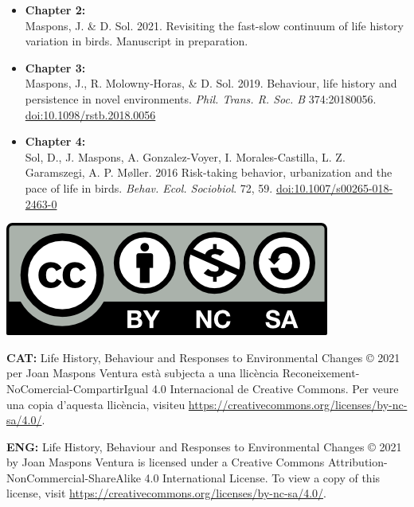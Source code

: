 \documentclass[12pt,a4paper,twoside,fleqn]{memoir}
\begin{document}
\begin{itemize}
  \item \textbf{Chapter 2:} \\
  Maspons, J. \& D. Sol. 2021. Revisiting the fast-slow continuum of life history variation in birds. Manuscript in preparation.
  
  \item \textbf{Chapter 3:} \\
  Maspons, J., R. Molowny‐Horas, \& D. Sol. 2019. Behaviour, life history and persistence in novel environments. \textit{Phil. Trans. R. Soc. B} 374:20180056. \href{http://dx.doi.org/10.1098/rstb.2018.0056}{doi:10.1098/rstb.2018.0056}
  
  \item \textbf{Chapter 4:} \\
  Sol, D., J. Maspons, A. Gonzalez-Voyer, I. Morales-Castilla, L. Z. Garamszegi, A. P. M\o{}ller. 2016 Risk-taking behavior, urbanization and the pace of life in birds. \textit{Behav. Ecol. Sociobiol}. 72, 59. \href{http://dx.doi.org/10.1007/s00265-018-2463-0}{doi:10.1007/s00265-018-2463-0}

\end{itemize}

\bigskip

\begin{center}
 \includegraphics{./Figures/intro/CC_BY-NC-SA.png}
\end{center}

\textbf{CAT:} Life History, Behaviour and Responses to Environmental Changes © 2021 per Joan
Maspons Ventura està subjecta a una llicència
Reconeixement-NoComercial-CompartirIgual 4.0 Internacional de Creative Commons.
Per veure una copia d'aquesta llicència, visiteu
\url{https://creativecommons.org/licenses/by-nc-sa/4.0/}.

\medskip

\textbf{ENG:} Life History, Behaviour and Responses to Environmental Changes © 2021 by Joan
Maspons Ventura is licensed under a Creative Commons
Attribution-NonCommercial-ShareAlike 4.0 International License. To view a copy
of this license, visit \url{https://creativecommons.org/licenses/by-nc-sa/4.0/}.
\end{document}
